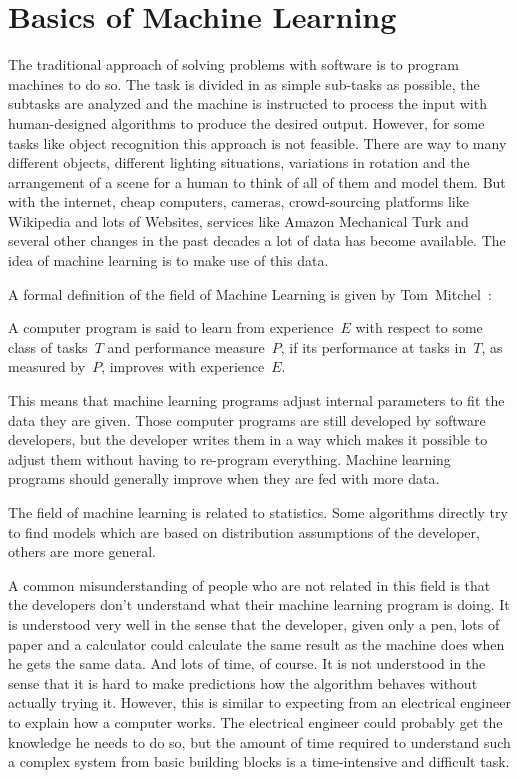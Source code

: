 
\section{Basics of Machine Learning}
\label{sec:ml-basics}
The traditional approach of solving problems with software is to program
machines to do so. The task is divided in as simple sub-tasks as possible,
the subtasks are analyzed and the machine is instructed to process the input
with human-designed algorithms to produce the desired output. However, for
some tasks like object recognition this approach is not feasible. There are
way to many different objects, different lighting situations, variations in
rotation and the arrangement of a scene for a human to think of all of them and
model them. But with the internet, cheap computers, cameras, crowd-sourcing
platforms like Wikipedia and lots of Websites, services like Amazon Mechanical
Turk and several other changes in the past decades a lot of data has become
available. The idea of machine learning is to make use of this data.

A formal definition of the field of Machine Learning is given by
Tom~Mitchel~\cite{Mitchell97}:
\begin{displayquote}
A computer program is said to learn from experience~$E$ with respect to some
class of tasks~$T$ and performance measure~$P$, if its performance at tasks
in~$T$, as measured by~$P$, improves with experience~$E$.
\end{displayquote}

This means that machine learning programs adjust internal parameters to fit the
data they are given. Those computer programs are still developed by software
developers, but the developer writes them in a way which makes it possible to
adjust them without having to re-program everything. Machine learning programs
should generally improve when they are fed with more data.

The field of machine learning is related to statistics. Some algorithms
directly try to find models which are based on distribution assumptions of the
developer, others are more general.

A common misunderstanding of people who are not related in this field is that
the developers don't understand what their machine learning program is doing.
It is understood very well in the sense that the developer, given only a pen,
lots of paper and a calculator could calculate the same result as the machine
does when he gets the same data. And lots of time, of course. It is not
understood in the sense that it is hard to make predictions how the algorithm
behaves without actually trying it. However, this is similar to expecting from
an electrical engineer to explain how a computer works. The electrical engineer
could probably get the knowledge he needs to do so, but the amount of time
required to understand such a complex system from basic building blocks is
a time-intensive and difficult task.

